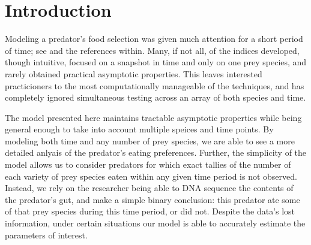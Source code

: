 \section{Introduction}
\label{sec:intro}

Modeling a predator's food selection was given much attention for a short period of time; see \citet{Strauss:1979} and the references within.  Many, if not all, of the indices developed, though intuitive, focused on a snapshot in time and only on one prey species, and rarely obtained practical asymptotic properties.  This leaves interested practicioners to the most computationally manageable of the techniques, and has completely ignored simultaneous testing across an array of both species and time.

The model presented here maintains tractable asymptotic properties while being general enough to take into account multiple speices and time points.  By modeling both time and any number of prey species, we are able to see a more detailed anlyais of the predator's eating preferences.  Further, the simplicity of the model allows us to consider predators for which exact tallies of the number of each variety of prey species eaten within any given time period is not observed.  Instead, we rely on the researcher being able to DNA sequence the contents of the predator's gut, and make a simple binary conclusion: this predator ate some of that prey species during this time period, or did not.  Despite the data's lost information, under certain situations our model is able to accurately estimate the parameters of interest.

